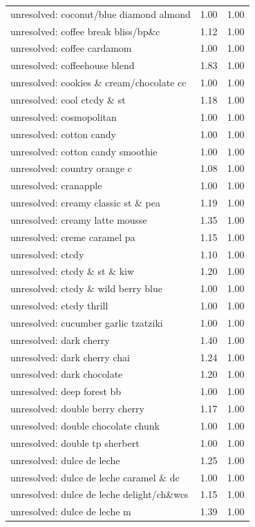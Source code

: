 \begin{table}
\begin{tabular}{lrr}
unresolved: coconut/blue diamond almond & 1.00 & 1.00 \\
unresolved: coffee break bliss/bp\&c & 1.12 & 1.00 \\
unresolved: coffee cardamom & 1.00 & 1.00 \\
unresolved: coffeehouse blend & 1.83 & 1.00 \\
unresolved: cookies \& cream/chocolate cc & 1.00 & 1.00 \\
unresolved: cool ctcdy \& st & 1.18 & 1.00 \\
unresolved: cosmopolitan & 1.00 & 1.00 \\
unresolved: cotton candy & 1.00 & 1.00 \\
unresolved: cotton candy smoothie & 1.00 & 1.00 \\
unresolved: country orange c & 1.08 & 1.00 \\
unresolved: cranapple & 1.00 & 1.00 \\
unresolved: creamy classic st \& pea & 1.19 & 1.00 \\
unresolved: creamy latte mousse & 1.35 & 1.00 \\
unresolved: creme caramel pa & 1.15 & 1.00 \\
unresolved: ctcdy & 1.10 & 1.00 \\
unresolved: ctcdy \& st \& kiw & 1.20 & 1.00 \\
unresolved: ctcdy \& wild berry blue & 1.00 & 1.00 \\
unresolved: ctcdy thrill & 1.00 & 1.00 \\
unresolved: cucumber garlic tzatziki & 1.00 & 1.00 \\
unresolved: dark cherry & 1.40 & 1.00 \\
unresolved: dark cherry chai & 1.24 & 1.00 \\
unresolved: dark chocolate & 1.20 & 1.00 \\
unresolved: deep forest bb & 1.00 & 1.00 \\
unresolved: double berry cherry & 1.17 & 1.00 \\
unresolved: double chocolate chunk & 1.00 & 1.00 \\
unresolved: double tp sherbert & 1.00 & 1.00 \\
unresolved: dulce de leche & 1.25 & 1.00 \\
unresolved: dulce de leche caramel \& dc & 1.00 & 1.00 \\
unresolved: dulce de leche delight/ch\&wcs & 1.15 & 1.00 \\
unresolved: dulce de leche m & 1.39 & 1.00 \\

\end{tabular}
\end{table}
